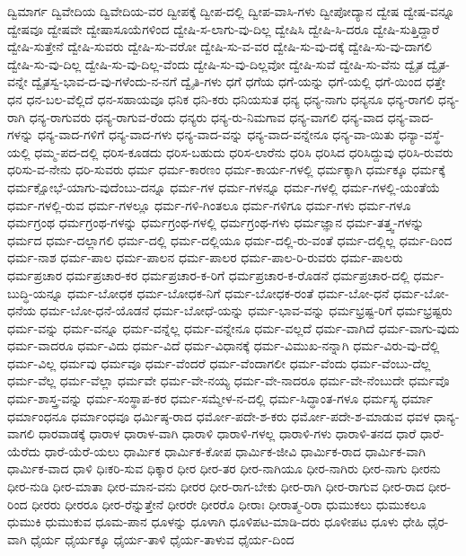 {ದ್ವಿಮಾರ್ಗ
ದ್ವಿವೇದಿಯ
ದ್ವಿವೇದಿಯ-ವರ
ದ್ವೀಪಕ್ಕೆ
ದ್ವೀಪ-ದಲ್ಲಿ
ದ್ವೀಪ-ವಾಸಿ-ಗಳು
ದ್ವೀಪೋದ್ಯಾನ
ದ್ವೇಷ
ದ್ವೇಷ-ವನ್ನೂ
ದ್ವೇಷವೂ
ದ್ವೇಷವೇ
ದ್ವೇಷಾಸೂಯೆಗಳಿಂದ
ದ್ವೇಷಿ-ಸ-ಲಾಗು-ವು-ದಿಲ್ಲ
ದ್ವೇಷಿಸಿ
ದ್ವೇಷಿ-ಸಿ-ದರೂ
ದ್ವೇಷಿ-ಸುತ್ತಿದ್ದಾರೆ
ದ್ವೇಷಿ-ಸುತ್ತೇನೆ
ದ್ವೇಷಿ-ಸುವರು
ದ್ವೇಷಿ-ಸು-ವರೋ
ದ್ವೇಷಿ-ಸು-ವ-ವರ
ದ್ವೇಷಿ-ಸು-ವು-ದಕ್ಕೆ
ದ್ವೇಷಿ-ಸು-ವು-ದಾಗಲಿ
ದ್ವೇಷಿ-ಸು-ವು-ದಿಲ್ಲ
ದ್ವೇಷಿ-ಸು-ವು-ದಿಲ್ಲ-ವೆಂದು
ದ್ವೇಷಿ-ಸು-ವು-ದಿಲ್ಲವೋ
ದ್ವೇಷಿ-ಸುವೆ
ದ್ವೇಷಿ-ಸು-ವೆನು
ದ್ವೈತ
ದ್ವೈತ-ವನ್ನೇ
ದ್ವೈತಸ್ವ-ಭಾವ-ದ-ವು-ಗಳೆಂದು-ನ-ನಗೆ
ದ್ವೈತಿ-ಗಳು
ಧಗೆ
ಧಗೆಯ
ಧಗೆ-ಯನ್ನು
ಧಗೆ-ಯಲ್ಲಿ
ಧಗೆ-ಯಿಂದ
ಧತ್ತೇ
ಧನ
ಧನ-ಬಲ-ವೆಲ್ಲಿದೆ
ಧನ-ಸಹಾಯವೂ
ಧನಿಕ
ಧನಿ-ಕರು
ಧನಿಯಸುತ
ಧನ್ಯ
ಧನ್ಯ-ನಾಗು
ಧನ್ಯನೂ
ಧನ್ಯ-ರಾಗಲಿ
ಧನ್ಯ-ರಾಗಿ
ಧನ್ಯ-ರಾಗುವರು
ಧನ್ಯ-ರಾಗುವ-ರೆಂದು
ಧನ್ಯರು
ಧನ್ಯ-ರು-ನಿಮಗಾವ
ಧನ್ಯ-ವಾಗಲಿ
ಧನ್ಯ-ವಾದ
ಧನ್ಯ-ವಾದ-ಗಳನ್ನು
ಧನ್ಯ-ವಾದ-ಗಳಿಗೆ
ಧನ್ಯ-ವಾದ-ಗಳು
ಧನ್ಯ-ವಾದ-ವನ್ನು
ಧನ್ಯ-ವಾದ-ವನ್ನೇನೂ
ಧನ್ಯ-ವಾ-ಯಿತು
ಧನ್ಯಾ-ವಸ್ಥೆ-ಯಲ್ಲಿ
ಧಮ್ಮ-ಪದ-ದಲ್ಲಿ
ಧರಿಸ-ಕೂಡದು
ಧರಿಸ-ಬಹುದು
ಧರಿಸ-ಲಾರೆನು
ಧರಿಸಿ
ಧರಿಸಿದ
ಧರಿಸಿದ್ದುವು
ಧರಿಸಿ-ರುವರು
ಧರಿಸು-ವ-ನೇನು
ಧರಿ-ಸುವರು
ಧರ್ಮ
ಧರ್ಮ-ಕಾರಣಂ
ಧರ್ಮ-ಕಾರ್ಯ-ಗಳಲ್ಲಿ
ಧರ್ಮಕ್ಕಾಗಿ
ಧರ್ಮಕ್ಕೂ
ಧರ್ಮಕ್ಕೆ
ಧರ್ಮಕ್ಷೋಭೆ-ಯಾಗು-ವುದೆಂಬು-ದನ್ನೂ
ಧರ್ಮ-ಗಳ
ಧರ್ಮ-ಗಳನ್ನೂ
ಧರ್ಮ-ಗಳಲ್ಲಿ
ಧರ್ಮ-ಗಳಲ್ಲಿ-ಯಂತೆಯೆ
ಧರ್ಮ-ಗಳಲ್ಲಿ-ರುವ
ಧರ್ಮ-ಗಳಲ್ಲೂ
ಧರ್ಮ-ಗಳಿ-ಗಿಂತಲೂ
ಧರ್ಮ-ಗಳಿಗೂ
ಧರ್ಮ-ಗಳು
ಧರ್ಮ-ಗಳೂ
ಧರ್ಮಗ್ರಂಥ
ಧರ್ಮಗ್ರಂಥ-ಗಳನ್ನು
ಧರ್ಮಗ್ರಂಥ-ಗಳಲ್ಲಿ
ಧರ್ಮಗ್ರಂಥ-ಗಳು
ಧರ್ಮಜ್ಞಾನ
ಧರ್ಮ-ತತ್ತ್ವ-ಗಳನ್ನು
ಧರ್ಮದ
ಧರ್ಮ-ದಲ್ಲಾಗಲಿ
ಧರ್ಮ-ದಲ್ಲಿ
ಧರ್ಮ-ದಲ್ಲಿಯೂ
ಧರ್ಮ-ದಲ್ಲಿ-ರು-ವಂತೆ
ಧರ್ಮ-ದಲ್ಲಿಲ್ಲ
ಧರ್ಮ-ದಿಂದ
ಧರ್ಮ-ನಾಶ
ಧರ್ಮ-ಪಾಲ
ಧರ್ಮ-ಪಾಲನ
ಧರ್ಮ-ಪಾಲರ
ಧರ್ಮ-ಪಾಲ-ರಿ-ರುವರು
ಧರ್ಮ-ಪಾಲರು
ಧರ್ಮಪ್ರಚಾರ
ಧರ್ಮಪ್ರಚಾರ-ಕರ
ಧರ್ಮಪ್ರಚಾರ-ಕ-ರಿಗೆ
ಧರ್ಮಪ್ರಚಾರ-ಕ-ರೊಡನೆ
ಧರ್ಮಪ್ರಚಾರ-ದಲ್ಲಿ
ಧರ್ಮ-ಬುದ್ಧಿ-ಯನ್ನೂ
ಧರ್ಮ-ಬೋಧಕ
ಧರ್ಮ-ಬೋಧಕ-ನಿಗೆ
ಧರ್ಮ-ಬೋಧಕ-ರಂತೆ
ಧರ್ಮ-ಬೋ-ಧನೆ
ಧರ್ಮ-ಬೋ-ಧನೆಯ
ಧರ್ಮ-ಬೋ-ಧನೆ-ಯೊಡನೆ
ಧರ್ಮ-ಬೋಧೆ-ಯನ್ನು
ಧರ್ಮ-ಭಾವ-ವನ್ನು
ಧರ್ಮಭ್ರಷ್ಟ-ರಿಗೆ
ಧರ್ಮಭ್ರಷ್ಟರು
ಧರ್ಮ-ವನ್ನು
ಧರ್ಮ-ವನ್ನೂ
ಧರ್ಮ-ವನ್ನೆಲ್ಲ
ಧರ್ಮ-ವನ್ನೇನೂ
ಧರ್ಮ-ವಲ್ಲದೆ
ಧರ್ಮ-ವಾಗಿದೆ
ಧರ್ಮ-ವಾಗು-ವುದು
ಧರ್ಮ-ವಾದರೂ
ಧರ್ಮ-ವಿದು
ಧರ್ಮ-ವಿದೆ
ಧರ್ಮ-ವಿಧಾನಕ್ಕೆ
ಧರ್ಮ-ವಿಮುಖ-ನನ್ನಾಗಿ
ಧರ್ಮ-ವಿರು-ವು-ದೆಲ್ಲಿ
ಧರ್ಮ-ವಿಲ್ಲ
ಧರ್ಮವು
ಧರ್ಮವೂ
ಧರ್ಮ-ವೆಂದರೆ
ಧರ್ಮ-ವೆಂದಾಗಲೀ
ಧರ್ಮ-ವೆಂದು
ಧರ್ಮ-ವೆಂಬು-ದೆಲ್ಲ
ಧರ್ಮ-ವೆಲ್ಲ
ಧರ್ಮ-ವೆಲ್ಲಾ
ಧರ್ಮವೇ
ಧರ್ಮ-ವೇ-ನಯ್ಯ
ಧರ್ಮ-ವೇ-ನಾದರೂ
ಧರ್ಮ-ವೇ-ನೆಂಬುದೇ
ಧರ್ಮವೊ
ಧರ್ಮ-ಶಾಸ್ತ್ರ-ವನ್ನು
ಧರ್ಮ-ಸಂಸ್ಥಾಪ-ಕರ
ಧರ್ಮ-ಸಮ್ಮೇಳ-ನ-ದಲ್ಲಿ
ಧರ್ಮ-ಸಿದ್ಧಾಂತ-ಗಳೂ
ಧರ್ಮಸ್ಯ
ಧರ್ಮಾ
ಧರ್ಮಾಂಧನೂ
ಧರ್ಮಾಂಧವೂ
ಧರ್ಮಿಷ್ಠ-ರಾದ
ಧರ್ಮೋ-ಪದೇ-ಶ-ಕರು
ಧರ್ಮೋ-ಪದೇ-ಶ-ಮಾಡುವ
ಧವಳ
ಧಾನ್ಯ-ವಾಗಲಿ
ಧಾರವಾಡಕ್ಕೆ
ಧಾರಾಳ
ಧಾರಾಳ-ವಾಗಿ
ಧಾರಾಳಿ
ಧಾರಾಳಿ-ಗಳಲ್ಲ
ಧಾರಾಳಿ-ಗಳು
ಧಾರಾಳಿ-ತನದ
ಧಾರೆ
ಧಾರೆ-ಯೆರೆದು
ಧಾರೆ-ಯೆರೆ-ಯಲು
ಧಾರ್ಮಿಕ
ಧಾರ್ಮಿಕ-ಕೋಪ
ಧಾರ್ಮಿಕ-ಜೀವಿ
ಧಾರ್ಮಿಕ-ರಾದ
ಧಾರ್ಮಿಕ-ವಾಗಿ
ಧಾರ್ಮಿಕ-ವಾದ
ಧಾಳಿ
ಧಿಃಕರಿ-ಸುವ
ಧಿಕ್ಕಾರ
ಧೀರ
ಧೀರ-ತರ
ಧೀರ-ನಾಗಿಯೂ
ಧೀರ-ನಾಗಿರು
ಧೀರ-ನಾಗು
ಧೀರನು
ಧೀರ-ನುಡಿ
ಧೀರ-ಮಾತಾ
ಧೀರ-ಮಾನ-ವನು
ಧೀರರ
ಧೀರ-ರಾಗ-ಬೇಕು
ಧೀರ-ರಾಗಿ
ಧೀರ-ರಾಗುವ
ಧೀರ-ರಾದ
ಧೀರ-ರಿಂದ
ಧೀರರು
ಧೀರರೂ
ಧೀರ-ರೆನ್ನುತ್ತೇನೆ
ಧೀರರೇ
ಧೀರರೊ
ಧೀರಾಃ
ಧೀರಾತ್ಮ-ರಿರಾ
ಧುಮುಕಲು
ಧುಮುಕಲೂ
ಧುಮುಕಿ
ಧುಮುಕುವ
ಧೂಮ-ಪಾನ
ಧೂಳನ್ನು
ಧೂಳಾಗಿ
ಧೂಳಿಪಟ-ಮಾಡಿ-ದರು
ಧೂಳೀಪಟ
ಧೂಳು
ಧೇಹಿ
ಧೈರ-ವಾಗಿ
ಧೈರ್ಯ
ಧೈರ್ಯಕ್ಕೂ
ಧೈರ್ಯ-ತಾಳಿ
ಧೈರ್ಯ-ತಾಳುವ
ಧೈರ್ಯ-ದಿಂದ
}

